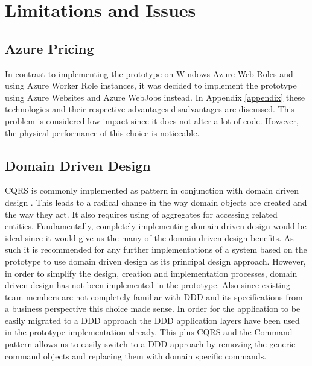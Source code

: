 \section{Limitations and Issues}
\subsection{Azure Pricing}
In contrast to implementing the prototype on Windows Azure Web Roles and using Azure Worker Role instances, it was decided to implement the prototype using Azure Websites and Azure WebJobs instead. In Appendix \ref{appendix} these technologies and their respective advantages disadvantages are discussed. This problem is considered low impact since it does not alter a lot of code. However, the physical performance of this choice is noticeable.

\subsection{Domain Driven Design}
CQRS is commonly implemented as pattern in conjunction with domain driven design \cite{Swanson}. This leads to a radical change in the way domain objects are created and the way they act. It also requires using of aggregates for accessing related entities. Fundamentally, completely implementing domain driven design would be ideal since it would give us the many of the domain driven design benefits. As such it is recommended for any further implementations of a system based on the prototype to use domain driven design as its principal design approach. However, in order to simplify the design, creation and implementation processes, domain driven design has not been implemented in the prototype. Also since existing team members are not completely familiar with DDD and its specifications from a business perspective this choice made sense. In order for the application to be easily migrated to a DDD approach the DDD application layers have been used in the prototype implementation already. This plus CQRS and the Command pattern allows us to easily switch to a DDD approach by removing the generic command objects and replacing them with domain specific commands.

